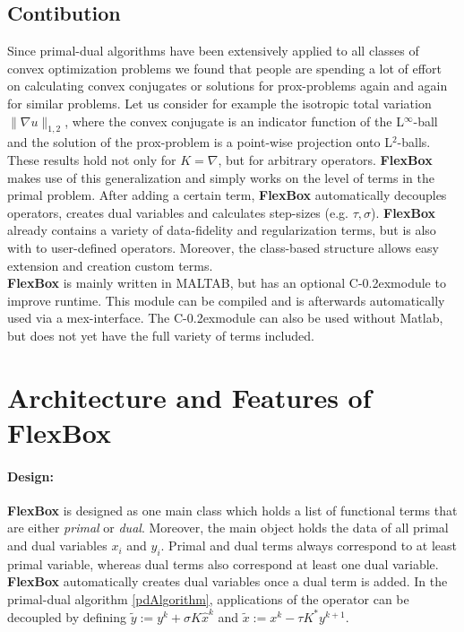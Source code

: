 \documentclass[final,leqno,onefignum,onetabnum]{article}
\newcommand{\1}[1]{\mathds{1}_{#1}}
\newcommand*\cpp{C\kern-0.2ex\raisebox{0.4ex}{\scalebox{0.8}{+\kern-0.4ex+}}}
\begin{document}
\subsection{Contibution}
Since primal-dual algorithms have been extensively applied to all classes of convex optimization problems we found that people are spending a lot of effort on calculating convex conjugates or solutions for prox-problems again and again for similar problems. Let us consider for example the isotropic total variation $\|\nabla u\|_{1,2}$, where the convex conjugate is an indicator function of the L$^\infty$-ball and the solution of the prox-problem is a point-wise projection onto L$^2$-balls. These results hold not only for $K=\nabla$, but for arbitrary operators. \textbf{FlexBox} makes use of this generalization and simply works on the level of terms in the primal problem. After adding a certain term, \textbf{FlexBox} automatically decouples operators, creates dual variables and calculates step-sizes (e.g. $\tau, \sigma$). \textbf{FlexBox} already contains a variety of data-fidelity and regularization terms, but is also with to user-defined operators. Moreover, the class-based structure allows easy extension and creation custom terms.\\
\textbf{FlexBox} is mainly written in MALTAB, but has an optional \cpp module to improve runtime. This module can be compiled and is afterwards automatically used via a mex-interface. The \cpp module can also be used without Matlab, but does not yet have the full variety of terms included.

\section{Architecture and Features of FlexBox}
\paragraph{Design:} 
\textbf{FlexBox} is designed as one main class which holds a list of functional terms that are either \textit{primal} or \textit{dual}. Moreover, the main object holds the data of all primal and dual variables $x_i$ and $y_i$. Primal and dual terms always correspond to at least primal variable, whereas dual terms also correspond at least one dual variable. \textbf{FlexBox} automatically creates dual variables once a dual term is added. In the primal-dual algorithm \eqref{pdAlgorithm}, applications of the operator can be decoupled by defining $\tilde{y} := y^k+\sigma K\hat{x}^k$ and $\tilde{x} := x^k-\tau K^* y^{k+1}$. 
\end{document}
